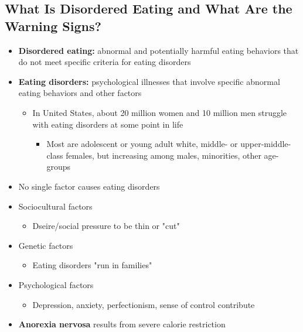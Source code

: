 \documentclass[12pt]{article}
\begin{document}
        \subsection{What Is Disordered Eating and What Are the Warning Signs?}
            \begin{itemize}
                \item \textbf{Disordered eating:} abnormal and potentially harmful eating behaviors that do not meet specific criteria for eating disorders
                \item \textbf{Eating disorders:} psychological illnesses that involve specific abnormal eating behaviors and other factors
                    \begin{itemize}
                        \item In United States, about 20 million women and 10 million men struggle with eating disorders at some point in life
                            \begin{itemize}
                                \item Most are adolescent or young adult white, middle- or upper-middle-class females, but increasing among males, minorities, other age-groups
                            \end{itemize}
                    \end{itemize}
                \item No single factor causes eating disorders
                \item Sociocultural factors
                    \begin{itemize}
                        \item Dseire/social pressure to be thin or "cut"
                    \end{itemize}
                \item Genetic factors
                    \begin{itemize}
                        \item Eating disorders "run in families"
                    \end{itemize}
                \item Psychological factors
                    \begin{itemize}
                        \item Depression, anxiety, perfectionism, sense of control contribute
                    \end{itemize}
                \item \textbf{Anorexia nervosa} results from severe calorie restriction

\end{itemize}
\end{document}
